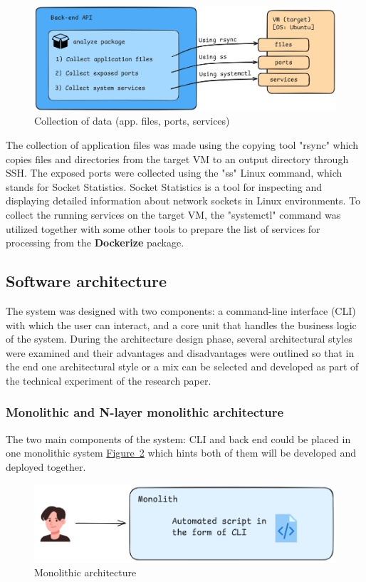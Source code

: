 \documentclass[twocolumn]{article}
\newcommand{\FigRef}[1]{\hyperref[#1]{Figure~\ref{#1}}}
\begin{document}
\begin{figure}[H]
    \centering
    \includegraphics[width=\linewidth]{images/data-collection.png}
    \caption{Collection of data (app. files, ports, services)}
    \label{fig:data-colleciton}
\end{figure}

The collection of application files was made using the copying tool "rsync" which copies files and directories from the target VM to an output directory through SSH. The exposed ports were collected using the "ss" Linux command, which stands for Socket Statistics. Socket Statistics is a tool for inspecting and displaying detailed information about network sockets in Linux environments. To collect the running services on the target VM, the "systemctl" command was utilized together with some other tools to prepare the list of services for processing from the \textbf{Dockerize} package.

\subsection{Software architecture}
The system was designed with two components: a command-line interface (CLI) with which the user can interact, and a core unit that handles the business logic of the system. During the architecture design phase, several architectural styles were examined and their advantages and disadvantages were outlined so that in the end one architectural style or a mix can be selected and developed as part of the technical experiment of the research paper.

\subsubsection{Monolithic and N-layer monolithic architecture}
The two main components of the system: CLI and back end could be placed in one monolithic system \FigRef{fig:monolithic-architecture} which hints both of them will be developed and deployed together.

\begin{figure}[H]
    \centering
    \includegraphics[width=\linewidth]{images/monolithic-architecture.png}
    \caption{Monolithic architecture}
    \label{fig:monolithic-architecture}
\end{figure}
\end{document}
